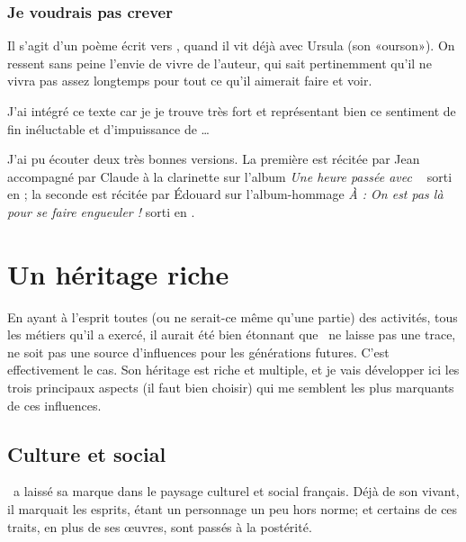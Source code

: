 \subsubsection{Je voudrais pas crever}
Il s'agit d'un poème écrit vers , quand il vit déjà avec Ursula
(son «ourson»). On ressent sans peine l'envie de vivre de
l'auteur, qui sait pertinemment qu'il ne vivra pas assez longtemps pour
tout ce qu'il aimerait faire et voir.

\begin{multicols}{2}
{\footnotesize
\settowidth{\versewidth}{Où valsent les brins d'algues}
\begin{verse}

\end{verse}
}
\end{multicols}

J'ai intégré ce texte car je je trouve très fort et représentant bien ce sentiment de fin inéluctable et d'impuissance de \BV\ldots

J'ai pu écouter
deux très bonnes versions. La première est récitée par Jean  accompagné
par Claude  à la clarinette sur l'album \emph{Une heure passée avec \BV\ }
sorti en ; la seconde est récitée par Édouard  sur
l'album-hommage \emph{À \BV: On est pas là pour se faire engueuler !} sorti en .

\section{Un héritage riche}

En ayant à l'esprit toutes (ou ne serait-ce même qu'une partie) des activités,
tous les métiers qu'il a exercé, il aurait été bien étonnant que \BV\ ne
laisse pas une trace, ne soit pas une source d'influences pour les générations
futures.
C'est effectivement le cas. Son héritage est riche et multiple, et je vais
développer ici les trois principaux aspects (il faut bien choisir) qui me semblent
les plus marquants de ces influences.

\subsection{Culture et social}

\BV\ a laissé sa marque dans le paysage culturel et social français. Déjà
de son vivant, il marquait les esprits, étant un personnage un peu hors norme; et
certains de ces traits, en plus de ses \oe{}uvres, sont passés à la postérité.

